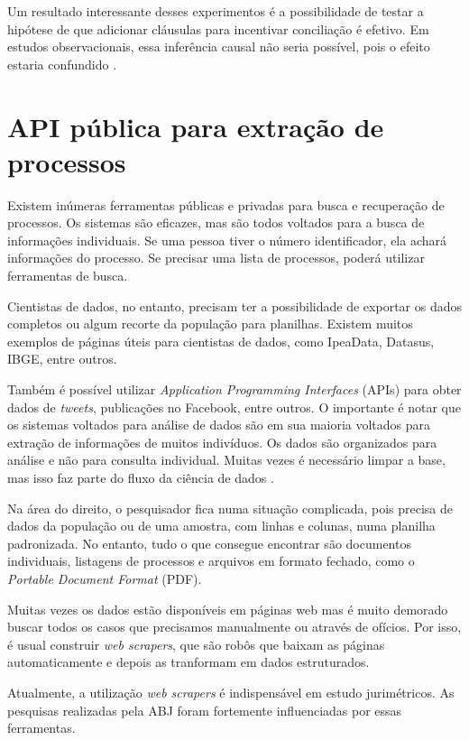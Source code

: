 \documentclass[]{report}
\begin{document}
Um resultado interessante desses experimentos é a possibilidade de
testar a hipótese de que adicionar cláusulas para incentivar conciliação
é efetivo. Em estudos observacionais, essa inferência causal não seria
possível, pois o efeito estaria confundido \citep{pearl2009causality}.

\section{API pública para extração de
processos}\label{api-publica-para-extracao-de-processos}

Existem inúmeras ferramentas públicas e privadas para busca e
recuperação de processos. Os sistemas são eficazes, mas são todos
voltados para a busca de informações individuais. Se uma pessoa tiver o
número identificador, ela achará informações do processo. Se precisar
uma lista de processos, poderá utilizar ferramentas de busca.

Cientistas de dados, no entanto, precisam ter a possibilidade de
exportar os dados completos ou algum recorte da população para
planilhas. Existem muitos exemplos de páginas úteis para cientistas de
dados, como IpeaData, Datasus, IBGE, entre outros.

Também é possível utilizar \emph{Application Programming Interfaces}
(APIs) para obter dados de \emph{tweets}, publicações no Facebook, entre
outros. O importante é notar que os sistemas voltados para análise de
dados são em sua maioria voltados para extração de informações de muitos
indivíduos. Os dados são organizados para análise e não para consulta
individual. Muitas vezes é necessário limpar a base, mas isso faz parte
do fluxo da ciência de dados \citep{wickham2016r}.

Na área do direito, o pesquisador fica numa situação complicada, pois
precisa de dados da população ou de uma amostra, com linhas e colunas,
numa planilha padronizada. No entanto, tudo o que consegue encontrar são
documentos individuais, listagens de processos e arquivos em formato
fechado, como o \emph{Portable Document Format} (PDF).

Muitas vezes os dados estão disponíveis em páginas web mas é muito
demorado buscar todos os casos que precisamos manualmente ou através de
ofícios. Por isso, é usual construir \emph{web scrapers}, que são robôs
que baixam as páginas automaticamente e depois as tranformam em dados
estruturados.

Atualmente, a utilização \emph{web scrapers} é indispensável em estudo
jurimétricos. As pesquisas realizadas pela ABJ foram fortemente
influenciadas por essas ferramentas.
\end{document}
